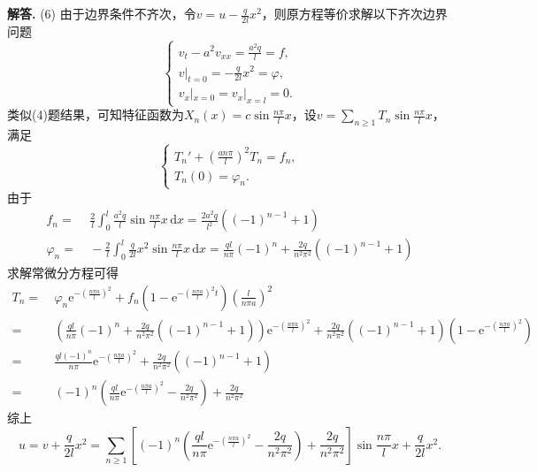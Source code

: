 \documentclass[12pt, a4paper, oneside]{ctexart}
\newenvironment{solution}[1][]{\par\noindent\textbf{#1解答. }}{\smallskip\par}  %
\let\geq=\geqslant %
\def\d{\mathrm{d}}          %
\def\e{\mathrm{e}}          %
\def\del{\vspace{-1.5ex}}   %
\begin{document}
\begin{solution}
    (6) 由于边界条件不齐次，令$v = u-\frac{q}{2l}x^2$，则原方程等价求解以下齐次边界问题\del
    \begin{equation*}
        \begin{cases}
            v_t-a^2v_{xx} = \frac{a^2q}{l} = f,\\
            v|_{t=0} = -\frac{q}{2l}x^2=\varphi,\\
            v_x|_{x=0} = v_x|_{x=l} = 0.
        \end{cases}
    \end{equation*}
    类似(4)题结果，可知特征函数为$X_n(x) = c\sin\frac{n\pi}{l}x$，设$v = \sum_{n\geq 1}T_n\sin\frac{n\pi}{l}x$，满足
    \begin{equation*}
        \begin{cases}
            T_n' + \left(\frac{an\pi}{l}\right)^2T_n = f_n,\\
            T_n(0) = \varphi_n.
        \end{cases}
    \end{equation*}
    由于
    \begin{align*}
        f_n =&\ \frac{2}{l}\int_0^l\frac{a^2q}{l}\sin\frac{n\pi}{l}x\,\d x = \frac{2a^2q}{l^2}((-1)^{n-1}+1)\\
        \varphi_n=&\ -\frac{2}{l}\int_0^l\frac{q}{2l}x^2\sin\frac{n\pi}{l}x\,\d x = \frac{ql}{n\pi}(-1)^n+\frac{2q}{n^2\pi^2}((-1)^{n-1}+1)
    \end{align*}
    求解常微分方程可得
    \begin{align*}
        T_n =&\ \varphi_n\e^{-\left(\frac{n\pi a}{l}\right)^2} + f_n\left(1-\e^{-\left(\frac{n\pi a}{l}\right)^2t}\right)\left(\frac{l}{n\pi a}\right)^2\\
        =&\ \left(\frac{ql}{n\pi}(-1)^n+\frac{2q}{n^2\pi^2}((-1)^{n-1}+1)\right)\e^{-\left(\frac{n\pi a}{l}\right)^2} + \frac{2q}{n^2\pi^2}((-1)^{n-1}+1)\left(1-\e^{-\left(\frac{n\pi a}{l}\right)^2}\right)\\
        =&\ \frac{ql(-1)^n}{n\pi}\e^{-\left(\frac{n\pi a}{l}\right)^2}+\frac{2q}{n^2\pi^2}((-1)^{n-1}+1)\\
        =&\ (-1)^n\left(\frac{ql}{n\pi}\e^{-\left(\frac{n\pi a}{l}\right)^2}-\frac{2q}{n^2\pi^2}\right)+\frac{2q}{n^2\pi^2}
    \end{align*}
    综上
    \begin{equation*}
        u = v+\frac{q}{2l}x^2 = \sum_{n\geq 1}\left[(-1)^n\left(\frac{ql}{n\pi}\e^{-\left(\frac{n\pi a}{l}\right)^2}-\frac{2q}{n^2\pi^2}\right)+\frac{2q}{n^2\pi^2}\right]\sin\frac{n\pi}{l}x+\frac{q}{2l}x^2.
    \end{equation*}
\end{solution}
\end{document}

